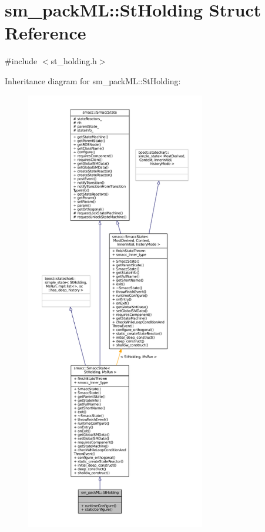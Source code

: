 \hypertarget{structsm__packML_1_1StHolding}{}\section{sm\+\_\+pack\+ML\+:\+:St\+Holding Struct Reference}
\label{structsm__packML_1_1StHolding}


{\ttfamily \#include $<$st\+\_\+holding.\+h$>$}



Inheritance diagram for sm\+\_\+pack\+ML\+:\+:St\+Holding\+:
\nopagebreak
\begin{figure}[H]
\begin{center}
\leavevmode
\includegraphics[height=550pt]{structsm__packML_1_1StHolding__inherit__graph}
\end{center}
\end{figure}


